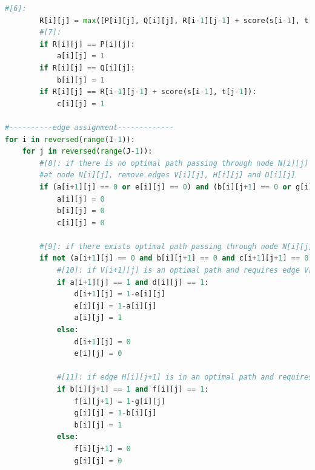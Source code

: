 \documentclass{article}
\begin{document}
\begin{lstlisting}[language = python]
        #[6]:
        R[i][j] = max([P[i][j], Q[i][j], R[i-1][j-1] + score(s[i-1], t[j-1])])
        #[7]:
        if R[i][j] == P[i][j]:
            a[i][j] = 1
        if R[i][j] == Q[i][j]:
            b[i][j] = 1
        if R[i][j] == R[i-1][j-1] + score(s[i-1], t[j-1]):
            c[i][j] = 1

#----------edge assignment-------------
for i in reversed(range(I-1)):
    for j in reversed(range(J-1)):
        #[8]: if there is no optimal path passing through node N[i][j] which has cost R[i][j]
        #at node N[i][j], remove edges V[i][j], H[i][j] and D[i][j]
        if (a[i+1][j] == 0 or e[i][j] == 0) and (b[i][j+1] == 0 or g[i][j] == 0) and (c[i+1][j+1] == 0):
            a[i][j] = 0
            b[i][j] = 0
            c[i][j] = 0

        #[9]: if there exists optimal path passing through node N[i][j]
        if not (a[i+1][j] == 0 and b[i][j+1] == 0 and c[i+1][j+1] == 0):
            #[10]: if V[i+1][j] is an optimal path and requires edge V[i][j] to be in an optimal path, determine if an optimal path that uses edge V[i+1][j] must use edge V[i][j] and the converse:
            if a[i+1][j] == 1 and d[i][j] == 1:
                d[i+1][j] = 1-e[i][j]
                e[i][j] = 1-a[i][j]
                a[i][j] = 1
            else:
                d[i+1][j] = 0
                e[i][j] = 0

            #[11]: if edge H[i][j+1] is in an optimal path and requires edge H[i][j] to be in an optimal path, determine if an optimal path that uses edge H[i][j+1] must use edge H[i][j] and the converse:
            if b[i][j+1] == 1 and f[i][j] == 1:
                f[i][j+1] = 1-g[i][j]
                g[i][j] = 1-b[i][j]
                b[i][j] = 1
            else:
                f[i][j+1] = 0
                g[i][j] = 0
	\end{lstlisting}
	
\end{document}
